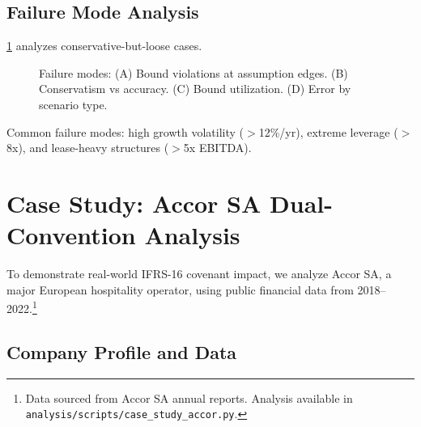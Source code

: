 \documentclass[11pt,a4paper]{article}
\theoremstyle{plain}
\theoremstyle{definition}
\newcommand{\Cref}[1]{\ref{#1}}
\begin{document}
\subsection{Failure Mode Analysis}

\Cref{fig:failure_modes} analyzes conservative-but-loose cases.

\begin{figure}[h]
\centering
{}
\caption{Failure modes: (A) Bound violations at assumption edges. (B) Conservatism vs accuracy. (C) Bound utilization. (D) Error by scenario type.}
\label{fig:failure_modes}
\end{figure}

Common failure modes: high growth volatility ($>$12\%/yr), extreme leverage ($>$8x), and lease-heavy structures ($>$5x EBITDA).

\section{Case Study: Accor SA Dual-Convention Analysis}
\label{sec:accor}

To demonstrate real-world IFRS-16 covenant impact, we analyze Accor SA, a major European hospitality operator, using public financial data from 2018--2022.\footnote{Data sourced from Accor SA annual reports. Analysis available in \texttt{analysis/scripts/case\_study\_accor.py}.}

\subsection{Company Profile and Data}
\end{document}

